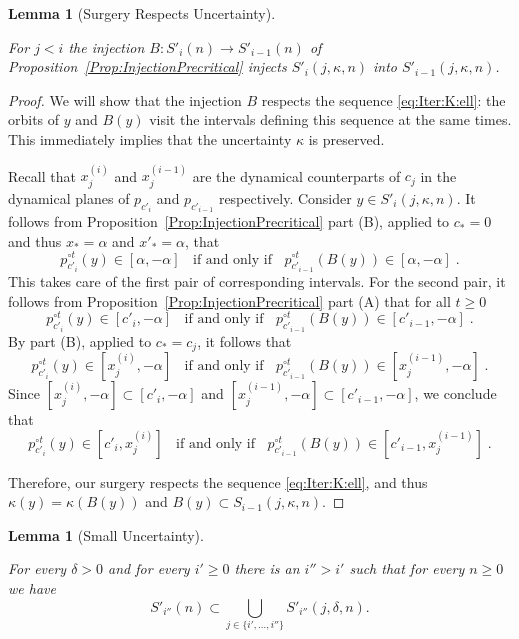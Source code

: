 \documentclass[12pt]{amsart}
\newcommand{\0}{\texttt{0}}
\newcommand{\1}{\texttt{1}}
\newtheorem{lemma}[theorem]{Lemma}
\theoremstyle{definition}
\numberwithin{equation}{section}
\newcommand{\lineclear}{\rule{0pt}{2pt}\newline}
\begin{document}
\begin{lemma}[Surgery Respects Uncertainty]
\label{lem:MonotIncl} \lineclear
For $j<i$ the injection $B:S'_{i}(n)\to S'_{i-1}(n)$ of Proposition~\ref{Prop:InjectionPrecritical} injects $S'_i(j,\kappa,n)$ into $S'_{i-1}(j,\kappa,n)$. 
\end{lemma}

\begin{proof}
We will show that the injection $B$ respects the sequence \eqref{eq:Iter:K:ell}: the orbits of $y$ and $B(y)$ visit the intervals defining this sequence at the same times. This immediately implies that the uncertainty $\kappa$ is preserved. 

Recall that $x_j^{(i)}$ and $x_j^{(i-1)}$ are the dynamical counterparts of $c_j$ in the dynamical planes of $p_{c'_i}$ and $p_{c'_{i-1}}$ respectively. Consider $y\in S'_i(j,\kappa,n)$. It follows from Proposition~\ref{Prop:InjectionPrecritical} part (B), applied to $c_*=0$ and thus $x_*=\alpha$ and $x'_*=\alpha$, that 
\[
p^{\circ t}_{c'_{i}}(y)\in [\alpha,-\alpha] \;\;\text{ if and only if }\;\; p^{\circ t}_{c'_{i-1}}(B(y))\in [\alpha,-\alpha]
\;.
\] 
This takes care of the first pair of corresponding intervals. For the second pair, it follows from Proposition~\ref{Prop:InjectionPrecritical} part (A) that for all $t\ge 0$
\[
p^{\circ t}_{c'_{i}}(y)\in [c'_{i},-\alpha] \;\;\text{ if and only if }\;\; p^{\circ t}_{c'_{i-1}}(B(y))\in [c'_{i-1},-\alpha]
\;.
\]
 By part (B), applied to $c_*=c_j$, it follows that 
\[
p^{\circ t}_{c'_{i}}(y)\in [x_j^{(i)},-\alpha] \;\;\text{ if and only if }\;\; p^{\circ t}_{c'_{i-1}}(B(y))\in [x_j^{(i-1)},-\alpha]
\;.
\] 
Since $[x_j^{(i)},-\alpha]\subset [c'_{i},-\alpha]$ and $[x_j^{(i-1)},-\alpha]\subset [c'_{i-1},-\alpha]$, we conclude that 
\[
p^{\circ t}_{c'_{i}}(y)\in [c'_{i},x_j^{(i)}]  \;\;\text{ if and only if }\;\; p^{\circ t}_{c'_{i-1}}(B(y))\in [c'_{i-1},x_j^{(i-1)}]
\;.
\]

Therefore, our surgery respects the sequence \eqref{eq:Iter:K:ell}, and thus $\kappa(y)=\kappa(B(y))$ and $B(y)\subset S_{i-1}(j,\kappa,n)$. 
\end{proof}



\begin{lemma}[Small Uncertainty]
\label{lem:SmallKappa} \lineclear
For every $\delta>0$ and for every $i'\ge 0$ there is an $i''>i'$ such that for every $n\ge 0$ we have 
\[
S'_{i''}(n)\subset \bigcup_{j\in \{i',\dots ,i''\}} S'_{i''}(j,\delta,n).
\]
\end{lemma}
\end{document}
